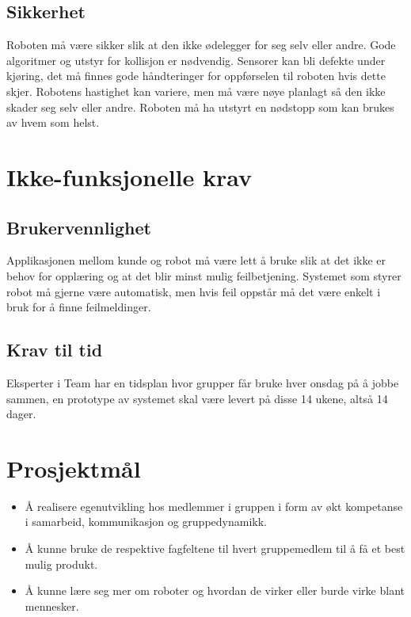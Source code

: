 \subsection{Sikkerhet}
Roboten må være sikker slik at den ikke ødelegger for seg selv eller andre. Gode algoritmer og utstyr for kollisjon er nødvendig. Sensorer kan bli defekte under kjøring, det må finnes gode håndteringer for oppførselen til roboten hvis dette skjer. Robotens hastighet kan variere, men må være nøye planlagt så den ikke skader seg selv eller andre. Roboten må ha utstyrt en nødstopp som kan brukes av hvem som helst.

\section{Ikke-funksjonelle krav}

\subsection{Brukervennlighet}
Applikasjonen mellom kunde og robot må være lett å bruke slik at det ikke er behov for opplæring og at det blir minst mulig feilbetjening. Systemet som styrer robot må gjerne være automatisk, men hvis feil oppstår må det være enkelt i bruk for å finne feilmeldinger.

\subsection{Krav til tid}
Eksperter i Team har en tidsplan hvor grupper får bruke hver onsdag på å jobbe sammen, en prototype av systemet skal være levert på disse 14 ukene, altså 14 dager.

\section{Prosjektmål}
\begin{itemize}
\item Å realisere egenutvikling hos medlemmer i gruppen i form av økt kompetanse i samarbeid, kommunikasjon og gruppedynamikk.
\item Å kunne bruke de respektive fagfeltene til hvert gruppemedlem til å få et best mulig produkt.
\item Å kunne lære seg mer om roboter og hvordan de virker eller burde virke blant mennesker.
\end{itemize}

